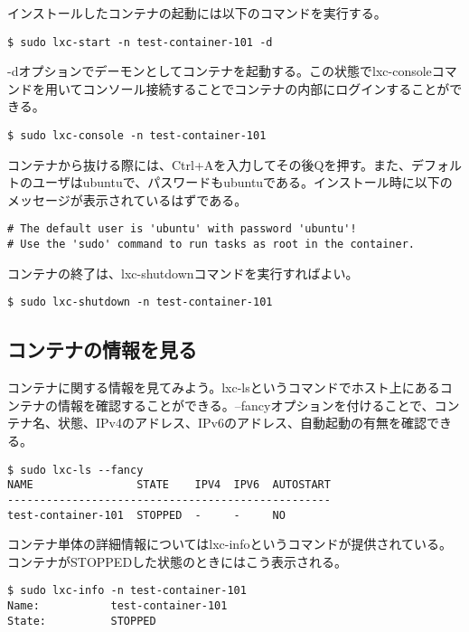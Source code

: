 \documentclass[9pt,b5paper,tombo]{jsbook}
\begin{document}
\newpage

\noindent
インストールしたコンテナの起動には以下のコマンドを実行する。

\begin{lstlisting}
$ sudo lxc-start -n test-container-101 -d
\end{lstlisting}

\noindent
-dオプションでデーモンとしてコンテナを起動する。この状態でlxc-consoleコマンドを用いてコンソール接続することでコンテナの内部にログインすることができる。

\begin{lstlisting}
$ sudo lxc-console -n test-container-101
\end{lstlisting}

\noindent
コンテナから抜ける際には、Ctrl+Aを入力してその後Qを押す。また、デフォルトのユーザはubuntuで、パスワードもubuntuである。インストール時に以下のメッセージが表示されているはずである。

\begin{lstlisting}
# The default user is 'ubuntu' with password 'ubuntu'!
# Use the 'sudo' command to run tasks as root in the container.
\end{lstlisting}

\noindent
コンテナの終了は、lxc-shutdownコマンドを実行すればよい。

\begin{lstlisting}
$ sudo lxc-shutdown -n test-container-101
\end{lstlisting}


\subsection{コンテナの情報を見る}
コンテナに関する情報を見てみよう。lxc-lsというコマンドでホスト上にあるコンテナの情報を確認することができる。--fancyオプションを付けることで、コンテナ名、状態、IPv4のアドレス、IPv6のアドレス、自動起動の有無を確認できる。

\begin{lstlisting}
$ sudo lxc-ls --fancy
NAME                STATE    IPV4  IPV6  AUTOSTART
--------------------------------------------------
test-container-101  STOPPED  -     -     NO
\end{lstlisting}

\noindent
コンテナ単体の詳細情報についてはlxc-infoというコマンドが提供されている。コンテナがSTOPPEDした状態のときにはこう表示される。

\begin{lstlisting}
$ sudo lxc-info -n test-container-101
Name:           test-container-101
State:          STOPPED
\end{lstlisting}
\end{document}
